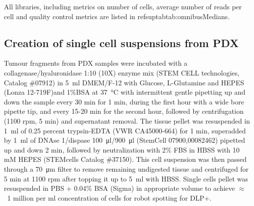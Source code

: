 All libraries, including metrics on number of cells, average number of reads per cell and quality control metrics are listed in refsuptab{tab:omnibusMedians}.

\subsection{Creation of single cell suspensions from PDX}
Tumour fragments from PDX samples were incubated with a collagenase/hyaluronidase 1:10 (10X) enzyme mix (STEM CELL technologies, Catalog \#07912) in  \SI{5}{\ml} DMEM/F-12 with Glucose, L-Glutamine and HEPES (Lonza 12-719F)and 1\%BSA at \SI{37}{\degreeCelsius} with intermittent gentle pipetting up and down the sample every 30 min for 1 min, during the first hour with a wide bore pipette tip, 
and every 15-20 min for the second hour, followed by  centrifugation (1100 rpm, 5 min) and supernatant removal.
The tissue pellet was resuspended in \SI{1}{\ml} of  0.25 percent trypsin-EDTA (VWR CA45000-664) for 1 min, 
superadded by \SI{1}{\ml} of DNAse 1/dispase \SI{100}{\ul}/\SI{900}{\ul} (StemCell 07900,00082462) pipetted up and down 2 min, followed by neutralization with 2\% FBS in HBSS with 10 mM HEPES (STEMcells Catalog \#37150). 
This cell suspension was then passed through a \SI{70}{\micro\metre} filter to remove remaining undigested tissue and centrifuged for 5 min at 1100 rpm after topping it up to \SI{5}{\ml} with HBSS.
Single cells pellet  was resuspended in PBS + 0.04\% BSA (Sigma) in appropriate volume to achieve  $\approx$~1 million per ml concentration of cells for robot spotting for DLP+.

